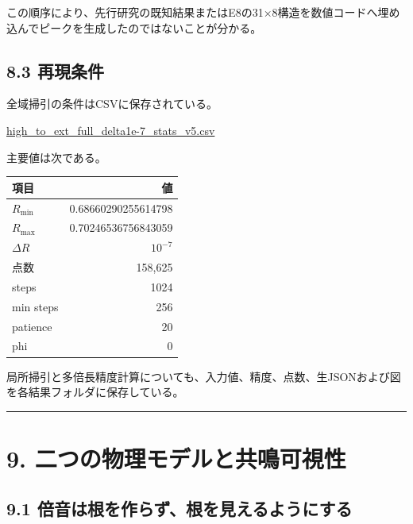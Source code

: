 \documentclass[
  10pt,
  a4paper,
]{article}
\newcounter{none} %
\begin{document}
この順序により、先行研究の既知結果またはE8の31×8構造を数値コードへ埋め込んでピークを生成したのではないことが分かる。

\subsection{8.3 再現条件}\label{ux518dux73feux6761ux4ef6}

全域掃引の条件はCSVに保存されている。

\href{../20260715/minimal_system_B_gray_bugcheck_result_v1/direct_depth_probe_v5_sweep_control/high_to_ext_full_delta1e-7_stats_v5.csv}{high\_to\_ext\_full\_delta1e-7\_stats\_v5.csv}

主要値は次である。

{\def\LTcaptype{none} %
\begin{longtable}[]{@{}lr@{}}
\toprule\noalign{}
項目 & 値 \\
\midrule\noalign{}
\endhead
\bottomrule\noalign{}
\endlastfoot
\(R_{\min}\) & 0.68660290255614798 \\
\(R_{\max}\) & 0.70246536756843059 \\
\(\Delta R\) & \(10^{-7}\) \\
点数 & 158,625 \\
steps & 1024 \\
min steps & 256 \\
patience & 20 \\
phi & 0 \\
\end{longtable}
}

局所掃引と多倍長精度計算についても、入力値、精度、点数、生JSONおよび図を各結果フォルダに保存している。

\begin{center}\rule{0.5\linewidth}{0.5pt}\end{center}

\section{9.
二つの物理モデルと共鳴可視性}\label{ux4e8cux3064ux306eux7269ux7406ux30e2ux30c7ux30ebux3068ux5171ux9cf4ux53efux8996ux6027}

\subsection{9.1
倍音は根を作らず、根を見えるようにする}\label{ux500dux97f3ux306fux6839ux3092ux4f5cux3089ux305aux6839ux3092ux898bux3048ux308bux3088ux3046ux306bux3059ux308b}
\end{document}

